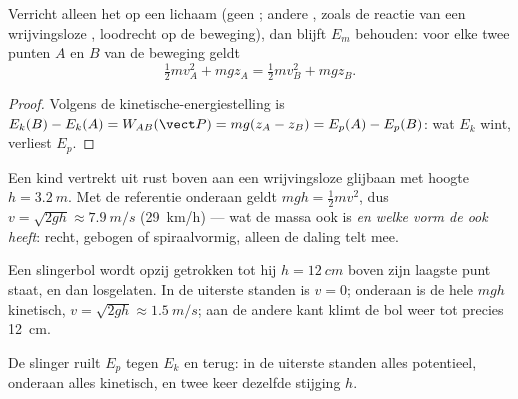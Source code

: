 \begin{theorem}\label{thm:g11:mechanical-energy:conservation}
Verricht alleen het   op een lichaam (geen ; andere
, zoals de reactie van een wrijvingsloze , loodrecht op de
beweging), dan blijft $E_m$ behouden: voor elke twee punten $A$ en $B$
van de beweging geldt
\[
\tfrac12 m v_A^2 + m g z_A = \tfrac12 m v_B^2 + m g z_B .
\]
\end{theorem}

\begin{proof}
Volgens de kinetische-energiestelling is
$E_k(B) - E_k(A) = W_{AB}(\vect P) = mg(z_A - z_B) = E_p(A) - E_p(B)$:
wat $E_k$ wint, verliest $E_p$.
\end{proof}

\begin{example}[Waterglijbaan]\label{ex:g11:mechanical-energy:slide}
Een kind vertrekt uit rust boven aan een wrijvingsloze glijbaan met
hoogte $h = \qty{3.2}{m}$. Met de referentie onderaan geldt
$mgh = \tfrac12 mv^2$, dus $v = \sqrt{2gh} \approx \qty{7.9}{m/s}$
(\qty{29}{km/h}) --- wat de massa ook is \emph{en welke vorm de  ook
heeft}: recht, gebogen of spiraalvormig, alleen de daling telt mee.
\end{example}

\begin{example}[Slinger]\label{ex:g11:mechanical-energy:pendulum}
Een slingerbol wordt opzij getrokken tot hij $h = \qty{12}{cm}$ boven
zijn laagste punt staat, en dan losgelaten. In de uiterste standen is
$v = 0$; onderaan is de hele $mgh$ kinetisch,
$v = \sqrt{2gh} \approx \qty{1.5}{m/s}$; aan de andere kant klimt de bol
weer tot precies \qty{12}{cm}.
\end{example}

\begin{omfigure}

{\small De slinger ruilt $E_p$ tegen $E_k$ en terug: in de uiterste
standen alles potentieel, onderaan alles kinetisch, en twee keer
dezelfde stijging $h$.}
\end{omfigure}

